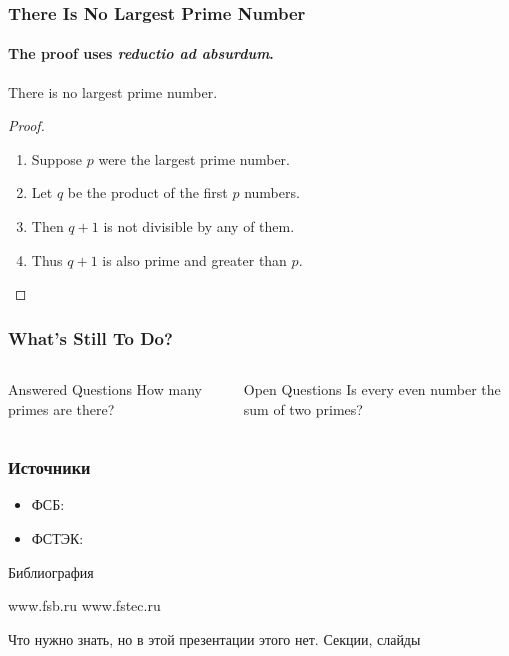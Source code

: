 \begin{frame}
\frametitle{There Is No Largest Prime Number}
\framesubtitle{The proof uses \textit{reductio ad absurdum}.}
\begin{theorem}
    There is no largest prime number.
\end{theorem}
\begin{proof}
    \begin{enumerate}
        \item<1-> Suppose $p$ were the largest prime number.
        \item<2-> Let $q$ be the product of the first $p$ numbers.
        \item<3-> Then $q + 1$ is not divisible by any of them.
        \item<1-> Thus $q + 1$ is also prime and greater than $p$.\qedhere
    \end{enumerate}
\end{proof}
\end{frame}


\begin{frame}
    \frametitle{What’s Still To Do?}
    
    \begin{columns}
            \begin{block}{Answered Questions}
                How many primes are there?
            \end{block}
        
            \begin{block}{Open Questions}
                Is every even number the sum of two primes? \cite{bib:fsb}
            \end{block}
    \end{columns}
\end{frame}


\begin{frame}
    \frametitle{Источники}
    \begin{itemize}
        \item ФСБ: \cite{bib:fsb}
        \item ФСТЭК: \cite{bib:fstec}
    \end{itemize}
\end{frame}


\begin{frame}[allowframebreaks]{Библиография}
\begin{thebibliography}{99}
    www.fsb.ru
    www.fstec.ru
\end{thebibliography}
\end{frame}


\appendix
Что нужно знать, но в этой презентации этого нет. Секции, слайды


